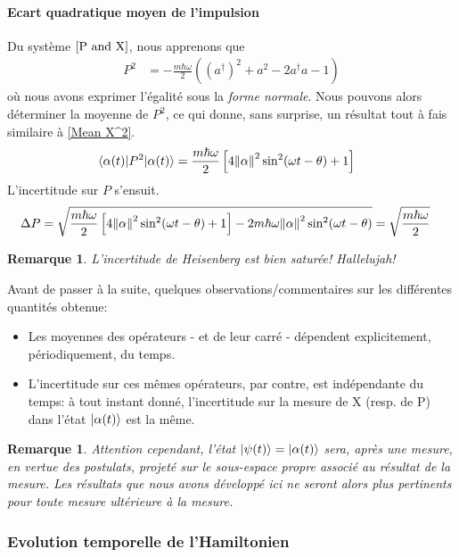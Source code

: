 \documentclass[11pt,oneside,a4paper]{article}
\newcommand{\h}{\ensuremath{\hbar}}
\newtheorem{remark}[theorem]{Remarque}
\begin{document}
\paragraph{Ecart quadratique moyen de l'impulsion}

Du système $\eqref{P and X}$, nous apprenons que 
\begin{align}
  P^2 &= -\frac{m\h\omega}{2}\left(\left(a^\dagger\right)^2+a^2-2a^\dagger a-1\right)
\end{align}
où nous avons exprimer l'égalité sous la \emph{forme normale}. Nous pouvons alors déterminer la moyenne de $P^2$, ce qui donne, sans surprise, un résultat tout à fais similaire à \eqref{Mean X^2}.
\begin{align}
  \label{Mean P^2}
  \expval{P^2}{\alpha(t)} &= \frac{m\h\omega}{2}\left[4\norm{\alpha}^2\sin^2(\omega t-\theta)+1\right]
\end{align}
L'incertitude sur $P$ s'ensuit.
\begin{align}
  \Delta P &= \sqrt{\frac{m\h\omega}{2}\left[4\norm{\alpha}^2\sin^2(\omega t-\theta)+1\right] - 2m\h\omega\norm{\alpha}^2\sin^2(\omega t-\theta)} = \sqrt{\frac{m\h\omega}{2}}
\end{align}

\begin{remark}
  L'incertitude de Heisenberg est bien saturée! Hallelujah!
\end{remark}

Avant de passer à la suite, quelques observations/commentaires sur les différentes quantités obtenue:
\begin{itemize}
  \item Les moyennes des opérateurs - et de leur carré - dépendent explicitement, périodiquement, du temps. 
  \item L'incertitude sur ces mêmes opérateurs, par contre, est indépendante du temps: à tout instant donné, l'incertitude sur la mesure de X (resp. de P) dans l'état $\ket{\alpha(t)}$ est la même.
\end{itemize}

\begin{remark}
  Attention cependant, l'état $\ket{\psi(t)} = \ket{\alpha(t)}$ sera, après une mesure, en vertue des postulats, projeté sur le sous-espace propre associé au résultat de la mesure. Les résultats que nous avons développé ici ne seront alors plus pertinents pour toute mesure ultérieure à la mesure.
\end{remark}

\subsubsection{Evolution temporelle de l'Hamiltonien}
\end{document}

